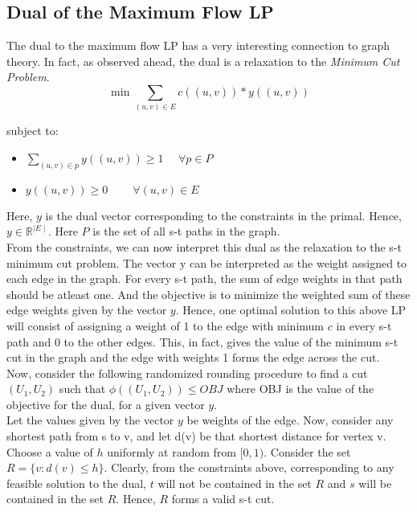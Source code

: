 \documentclass[BTech]{iitmdiss}
\begin{document}
	\subsection{Dual of the Maximum Flow LP}
	  The dual to the maximum flow LP has a very interesting connection to graph theory. In fact, as observed ahead, the dual is a relaxation 
	  to the \textit{Minimum Cut Problem}. \\
	  
	  $$\min \displaystyle\sum_{(u,v) \in E} c((u,v)) \ast y((u,v))$$
	  
	  subject to:
	  \begin{itemize}
	   \item 
	    $\displaystyle \sum_{(u,v) \in p} y((u,v)) \geq 1~~~~~~\forall p \in P$
	   \item
	    $y((u,v)) \geq 0 ~~~~~~~~~~ \forall (u,v) \in E$
	   
	  \end{itemize}

	  Here, $y$ is the dual vector corresponding to the constraints in the primal. Hence, $y \in \mathbb{R}^{\mid E\mid }$. Here $P$ is the set of all
	  s-t paths in the graph. \\
	  
	  From the constraints, we can now interpret this dual as the relaxation to the s-t minimum cut problem. The vector y can be interpreted 
	  as the weight assigned to each edge in the graph. For every s-t path, the sum of edge weights in that path should be atleast one. And the 
	  objective is to minimize the weighted sum of these edge weights given by the vector $y$. Hence, one optimal solution to this above LP
	  will consist of assigning a weight of 1 to the edge with minimum $c$ in every s-t path and 0 to the other edges. This, in fact, gives the 
	  value of the minimum s-t cut in the graph and the edge with weights 1 forms the edge across the cut. \\
	  
	  Now, consider the following randomized rounding procedure to find a cut $(U_1, U_2)$ such that $\phi((U_1, U_2)) \leq OBJ$ where OBJ is 
	  the value of the objective for the dual, for a given vector $y$. \\
	  
	  Let the values given by the vector $y$ be weights of the edge. Now, consider any shortest path from s to v, and let d(v) be that 
	  shortest distance for vertex v. Choose a value of $h$ uniformly at random from $[0,1)$. Consider the set 
	  $R = \{v:d(v) \leq h\}$. Clearly, from the constraints above, corresponding to any feasible solution to the dual, $t$ will not be contained 
	  in the set $R$ and $s$ will be contained in the set $R$. Hence, $R$ forms a valid s-t cut. \\
	  
\end{document}
